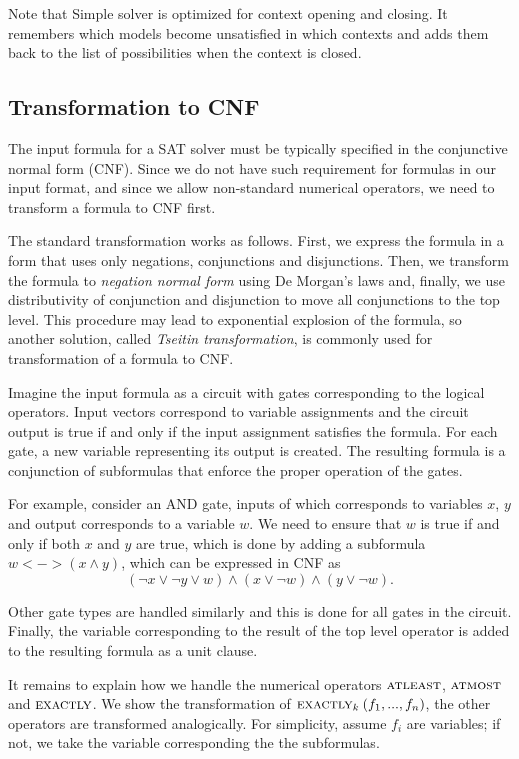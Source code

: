 Note that Simple solver is optimized for context opening and closing.
It remembers which models become unsatisfied in which contexts and
  adds them back to the list of possibilities when the context is closed.

\subsection{Transformation to CNF}

The input formula for a SAT solver must be typically specified
  in the conjunctive normal form (CNF).
Since we do not have such requirement for formulas in our input format,
  and since we allow non-standard numerical operators,
  we need to transform a formula to CNF first.

The standard transformation works as follows.
First, we express the formula in a form
  that uses only negations, conjunctions and disjunctions.
Then, we transform the formula to \emph{negation normal form} using De Morgan's laws
  and, finally, we use distributivity of conjunction and disjunction to
  move all conjunctions to the top level.
This procedure may lead to exponential explosion of the formula, so
another solution, called \emph{Tseitin transformation}, is commonly used
  for transformation of a formula to CNF\cite{tseitin}.

Imagine the input formula as a circuit with gates corresponding to the logical operators.
Input vectors correspond to variable assignments and the circuit output
  is true if and only if the input assignment satisfies the formula.
For each gate, a new variable representing its output is created.
The resulting formula is a conjunction of subformulas that enforce
  the proper operation of the gates.

For example, consider an AND gate, inputs of which corresponds to variables
  $x$, $y$ and output corresponds to a variable $w$.
We need to ensure that $w$ is true if and only if both $x$ and $y$ are true,
  which is done by adding a subformula $w <-> (x \wedge y)$, which can be
  expressed in CNF as
\[
(\neg x \vee \neg y \vee w) \wedge
(x \vee \neg w) \wedge
(y \vee \neg w).
\]

Other gate types are handled similarly and this is done for all gates in the circuit.
Finally, the variable
  corresponding to the result of the top level operator is added
  to the resulting formula as a unit clause.

It remains to explain how we handle the numerical operators
  $\textsc{atleast}$, $\textsc{atmost}$ and $\textsc{exactly}$.
We show the transformation of $\textsc{exactly}_{k}\:(f_1, ..., f_n)$,
  the other operators are transformed analogically.
For simplicity,
  assume $f_i$ are variables; if not, we take the variable corresponding the
  the subformulas.

